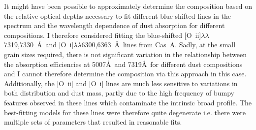 It might have been possible  to approximately determine the composition based on the relative optical depths necessary to fit different blue-shifted lines in the spectrum and the wavelength dependence of dust absorption for different compositions.  I therefore considered fitting the blue-shifted [O~{\sc ii}]$\lambda\lambda$7319,7330~\AA\  and [O~{\sc i}]$\lambda\lambda$6300,6363~\AA\  lines from Cas~A.  Sadly, at the small grain sizes required, there is not significant variation in the relationship between the absorption efficiencies at 5007\AA\  and 7319\AA\  for different dust compositions and I cannot therefore determine the composition via this approach in this case.  Additionally, the [O~{\sc ii}] and [O~{\sc i}] lines are much less sensitive to variations in both distribution and dust mass, partly due to the high frequency of bumpy features observed in these lines which contaminate the intrinsic broad profile.  The best-fitting models for these lines were therefore quite degenerate i.e. there were multiple sets of parameters that resulted in reasonable fits.  
